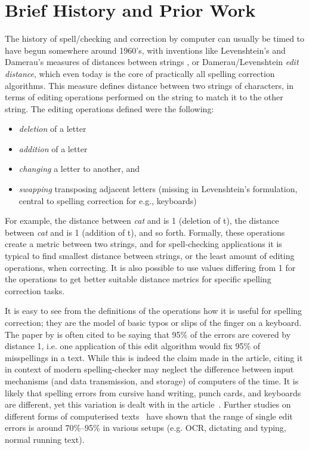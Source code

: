 \documentclass[officiallayout,final]{unihelcompling}
\newcommand\misspelt{\bgroup\markoverwith
{\textcolor{red}{\lower3.5pt\hbox{\sixly \char58}}}\ULon}
\begin{document}
\section{Brief History and Prior Work}
\label{sec:history}

The history of spell\-/checking and correction by computer can usually be timed
to have begun somewhere around 1960's, with inventions like Levenshtein's and
Damerau's measures of distances between strings
\citep{levenshtein1966binary,damerau1964technique}, or Damerau\-/Levenshtein
\emph{edit distance}, which even today is the core of practically all spelling
correction algorithms. This measure defines distance between two strings of
characters, in terms of editing operations performed on the string to match it
to the other string. The editing operations defined were the following:

\begin{itemize}
    \item \emph{deletion} of a letter
    \item \emph{addition} of a letter
    \item \emph{changing} a letter to another, and
    \item \emph{swapping} transposing adjacent letters (missing in
        Levenshtein's formulation, central to spelling correction for
        e.g., keyboards)
\end{itemize}

For example, the distance between \emph{cat} and \misspelt{ca} is 1 (deletion
of t), the distance between \emph{cat} and \misspelt{catt} is 1 (addition of
t), and so forth. Formally, these operations create a metric between two
strings, and for spell-checking applications it is typical to find smallest
distance between strings, or the least amount of editing operations, when
correcting. It is also possible to use values differing from 1 for the
operations to get better suitable distance metrics for specific spelling
correction tasks.

It is easy to see from the definitions of the operations how it is useful
for spelling correction; they are the model of basic typos or slips of the
finger on a keyboard. The paper by \citet{damerau1964technique} is often cited
to be saying that 95\% of the errors are covered by distance 1, i.e. one
application of this edit algorithm would fix 95\% of misspellings in a text.
While this is indeed the claim made in the article, citing it in context of
modern spelling-checker may neglect the difference between input mechanisms
(and data transmission, and storage) of computers of the time. It is likely
that spelling errors from cursive hand writing, punch cards, and keyboards are
different, yet this variation is dealt with in the
article~\citep{damerau1964technique}. Further studies on different forms of
computerised texts~\citep{kukich1992techniques} have shown that the range of
single edit errors is around 70\%--95\% in various setups (e.g. OCR,
dictating and typing, normal running text).
\end{document}
